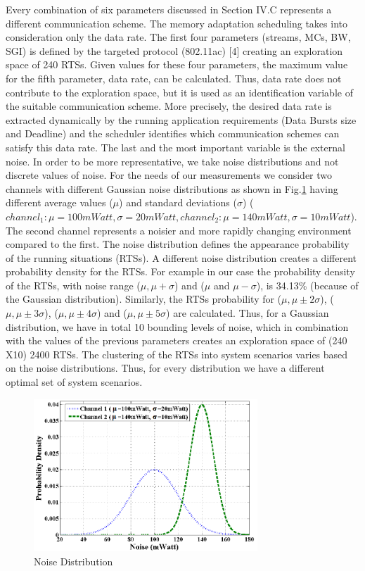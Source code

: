 Every combination of six parameters discussed in Section IV.C represents a different communication scheme. The memory adaptation scheduling takes into consideration only the data rate. The first four parameters (streams, MCs, BW, SGI) is defined by the targeted protocol (802.11ac) [4] creating an exploration space of 240 RTSs. Given values for these four parameters, the maximum value for the fifth parameter, data rate, can be calculated. Thus, data rate does not contribute to the exploration space, but it is used as an identification variable of the suitable communication scheme. More precisely, the desired data rate is extracted dynamically by the running application requirements (Data Bursts size and Deadline) and the scheduler identifies which communication schemes can satisfy this data rate.  
The last and the most important variable is the external noise. In order to be more representative, we take noise distributions and not discrete values of noise.
 For the needs of our measurements we consider two channels with different Gaussian noise distributions as shown in Fig.\ref{fig:F7} having different average values ($\mu$) and standard deviations ($ \sigma $) ($channel_1: \mu  =100mWatt,  \sigma =20mWatt, channel_2:  \mu =140mWatt,  \sigma  = 10mWatt $). 
 The second channel represents a noisier and more rapidly changing environment compared to the first. 
 The noise distribution defines the appearance probability of the running situations (RTSs). 
 A different noise distribution creates a different probability density for the RTSs. For example in our case the probability density of the RTSs, with noise range ($\mu, \mu + \sigma$) and ($\mu$ and $\mu - \sigma$), is 34.13\% (because of the Gaussian distribution). 
 Similarly, the RTSs probability for ($\mu, \mu \pm 2 \sigma$),  ($\mu, \mu \pm 3 \sigma $), ($\mu, \mu \pm 4 \sigma$) and ($\mu, \mu \pm 5 \sigma $) are calculated. 
 Thus, for a Gaussian distribution, we have in total 10 bounding levels of noise, which in combination with the values of the previous parameters creates an exploration space of (240 Χ10) 2400 RTSs. The clustering of the RTSs into system scenarios varies based on the noise distributions. Thus, for every distribution we have a different optimal set of system scenarios.

\begin{figure}
\centering
\includegraphics[width=0.75\textwidth]{F/image11.png}
\caption{Noise Distribution}
\label{fig:F7}
\end{figure}	


